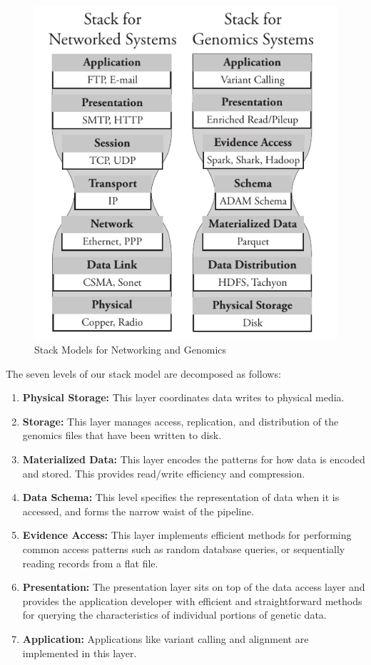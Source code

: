 \documentclass[10pt,twocolumn]{article}
\begin{document}
\begin{figure}[h]
\begin{center}
\includegraphics[width=0.9\linewidth]{stack-model.pdf}
\end{center}
\caption{Stack Models for Networking and Genomics}
\label{fig:stack-model}
\end{figure}

The seven levels of our stack model are decomposed as follows:

\begin{enumerate}
\item {\bf Physical Storage:} This layer coordinates data writes to physical media.
\item {\bf Storage:} This layer manages access, replication, and distribution of the genomics files that have been written to disk.
\item {\bf Materialized Data:} This layer encodes the patterns for how data is encoded and stored. This provides read/write efficiency
and compression.
\item {\bf Data Schema:} This level specifies the representation of data when it is accessed, and forms the narrow waist of the pipeline.
\item {\bf Evidence Access:} This layer implements efficient methods for performing common access patterns such as random database
queries, or sequentially reading records from a flat file.
\item {\bf Presentation:} The presentation layer sits on top of the data access layer and provides the application developer with efficient and
straightforward methods for querying the characteristics of individual portions of genetic data.
\item {\bf Application:} Applications like variant calling and alignment are implemented in this layer.
\end{enumerate}
\end{document}
